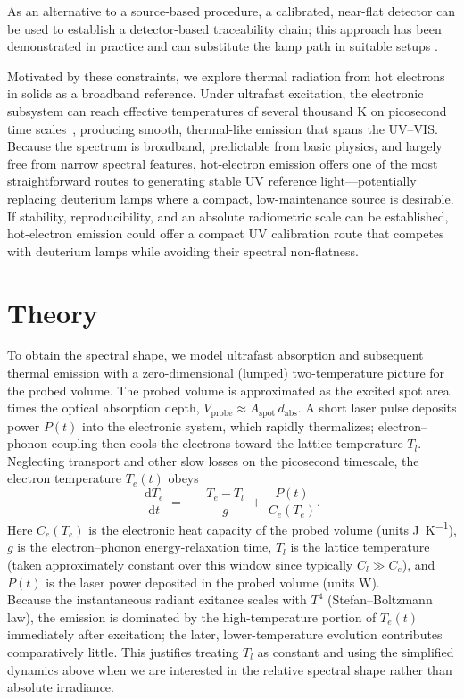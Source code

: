 \documentclass[
	parskip=half,
	a4paper,
]{scrarticle}
\begin{document}
As an alternative to a source-based procedure, a calibrated, near-flat detector can be used to establish a detector-based traceability chain; this approach has been demonstrated in practice and can substitute the lamp path in suitable setups \cite{larason_nist_1996}.

Motivated by these constraints, we explore thermal radiation from hot electrons in solids as a broadband reference. Under ultrafast excitation, the electronic subsystem can reach effective temperatures of several thousand \si{\kelvin} on picosecond time scales~\cite{lui_ultrafast_2010}, producing smooth, thermal-like emission that spans the UV–VIS. Because the spectrum is broadband, predictable from basic physics, and largely free from narrow spectral features, hot-electron emission offers one of the most straightforward routes to generating stable UV reference light—potentially replacing deuterium lamps where a compact, low-maintenance source is desirable. If stability, reproducibility, and an absolute radiometric scale can be established, hot-electron emission could offer a compact UV calibration route that competes with deuterium lamps while avoiding their spectral non-flatness.

\section{Theory}
To obtain the spectral shape, we model ultrafast absorption and subsequent thermal emission with a zero-dimensional (lumped) two-temperature picture for the probed volume. The probed volume is approximated as the excited spot area times the optical absorption depth, \(V_{\text{probe}} \approx A_{\text{spot}}\,d_{\text{abs}}\). A short laser pulse deposits power \(P(t)\) into the electronic system, which rapidly thermalizes; electron–phonon coupling then cools the electrons toward the lattice temperature \(T_l\). Neglecting transport and other slow losses on the picosecond timescale, the electron temperature \(T_e(t)\) obeys
\begin{equation}
    \frac{\mathrm d T_e}{\mathrm d t}
    \;=\;
    -\,\frac{T_e - T_l}{g}
    \;+\;
    \frac{P(t)}{C_e(T_e)}.
    \label{eq:Te}
\end{equation}
Here \(C_e(T_e)\) is the electronic heat capacity of the probed volume (units \si{J\per K}), \(g\) is the electron–phonon energy-relaxation time, \(T_l\) is the lattice temperature (taken approximately constant over this window since typically \(C_l \gg C_e\)), and \(P(t)\) is the laser power deposited in the probed volume (units \si{W}).\\
Because the instantaneous radiant exitance scales with \(T^4\) (Stefan–Boltzmann law), the emission is dominated by the high-temperature portion of \(T_e(t)\) immediately after excitation; the later, lower-temperature evolution contributes comparatively little. This justifies treating \(T_l\) as constant and using the simplified dynamics above when we are interested in the relative spectral shape rather than absolute irradiance.
\end{document}
